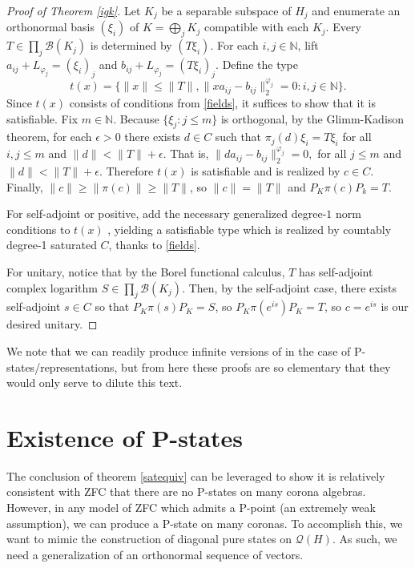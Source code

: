 \documentclass[10pt]{amsart}
\theoremstyle{definition}
\begin{document}
\begin{proof}[Proof of Theorem \ref{igk}]
    Let $K_j$ be a separable subspace of $H_j$ and enumerate an orthonormal basis $(\xi_i)$ of $K=\bigoplus_jK_j$ compatible with each $K_j$. Every $T\in\prod_j\mathscr{B}(K_j)$ is determined by $(T\xi_i)$. For each $i,j\in\mathbb{N}$, lift $a_{ij}+L_{\varphi_j}=(\xi_i)_j$ and $b_{ij}+L_{\varphi_j}=(T\xi_i)_j$.
    Define the type
    \[t(x)=\{\|x\|\leq\|T\|,\|xa_{ij}-b_{ij}\|^{\varphi_j}_2=0:i,j\in\mathbb{N}\}.\]
    Since $t(x)$ consists of conditions from \ref{fields}, it suffices to show that it is satisfiable. Fix $m\in\mathbb{N}$. Because $\{\xi_j:j\leq m\}$ is orthogonal, by the Glimm-Kadison theorem, for each $\epsilon>0$ there exists $d\in C$ such that $\pi_j(d)\xi_{i}=T\xi_i$ for all $i,j\leq m$ and $\|d\|<\|T\|+\epsilon$. That is,  $\|da_{ij}-b_{ij}\|^{\varphi_j}_2=0,$ for all $j\leq m$ and $\|d\|<\|T\|+\epsilon$. Therefore $t(x)$ is satisfiable and is realized by $c\in C$. Finally, $\|c\|\geq\|\pi(c)\|\geq\|T\|$, so $\|c\|=\|T\|$ and $P_K\pi(c)P_k=T$. 
    
    For self-adjoint or positive, add the necessary generalized degree-$1$ norm conditions to $t(x)$ \cite[15.2.9]{FA19}, yielding a satisfiable type which is realized by countably degree-1 saturated $C$, thanks to \ref{fields}.

    For unitary, notice that by the Borel functional calculus, $T$ has self-adjoint complex logarithm $S\in\prod_j\mathscr{B}(K_j)$. Then, by the self-adjoint case, there exists self-adjoint $s\in C$ so that $P_K\pi(s)P_K=S$, so $P_K\pi(e^{is})P_K=T$, so $c=e^{is}$ is our desired unitary.
\end{proof}

We note that we can readily produce infinite versions of \cite[3.5.5, 3.8.3, 3.9.6, 5.1.3, 5.6.6]{FA19} in the case of P-states/representations, but from here these proofs are so elementary that they would only serve to dilute this text.

\section{Existence of P-states}

The conclusion of theorem \ref{satequiv} can be leveraged to show it is relatively consistent with ZFC that there are no P-states on many corona algebras. However, in any model of ZFC which admits a P-point (an extremely weak assumption), we can produce a P-state on many coronas. To accomplish this, we want to mimic the construction of diagonal pure states on $\mathscr{Q}(H)$. As such, we need a generalization of an orthonormal sequence of vectors.
\end{document}
